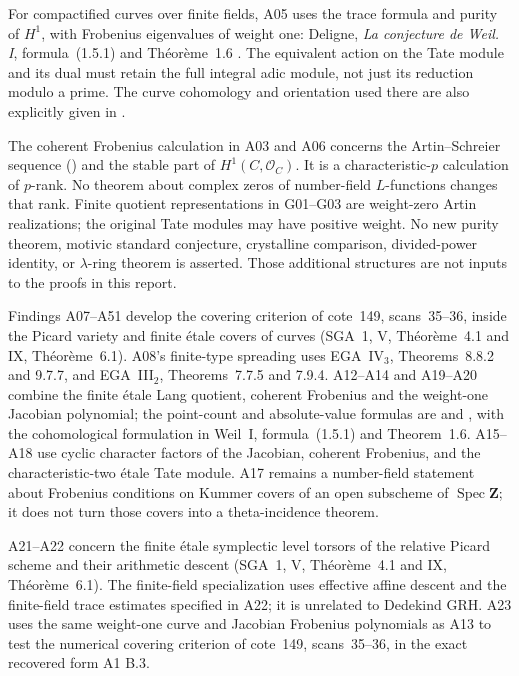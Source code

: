For compactified curves over finite fields, A05 uses the trace
formula and purity of $H^1$, with Frobenius eigenvalues of weight one:
Deligne, \emph{La conjecture de Weil. I}, formula~(1.5.1) and
Th\'eor\`eme~1.6 \cite{WeilI}. The equivalent action on the
Tate module and its dual must retain the full integral adic module,
not just its reduction modulo a prime. The curve cohomology and
orientation used there are also explicitly given in
\cite[Proposition~14.2 and Remark~14.10]{MilneLEC}.

The coherent Frobenius calculation in A03 and A06 concerns the
Artin--Schreier sequence (\cite[Example~7.9(b)]{MilneLEC}) and the stable part of $H^1(C,\mathcal O_C)$.
It is a characteristic-$p$ calculation of $p$-rank. No theorem about
complex zeros of number-field $L$-functions changes that rank.
Finite quotient representations in G01--G03 are weight-zero Artin
realizations; the original Tate modules may have positive weight.
No new purity theorem, motivic standard conjecture, crystalline
comparison, divided-power identity, or $\lambda$-ring theorem is
asserted. Those additional structures are not inputs to the proofs
in this report.


Findings A07--A51 develop the covering criterion of cote~149,
scans~35--36, inside the Picard variety and finite \'etale covers of
curves (SGA~1, V, Th\'eor\`eme~4.1 and IX, Th\'eor\`eme~6.1).
A08's finite-type spreading uses EGA~IV$_3$, Theorems~8.8.2 and
9.7.7, and EGA~III$_2$, Theorems~7.7.5 and 7.9.4.
A12--A14 and A19--A20 combine the finite \'etale Lang quotient,
coherent Frobenius and the weight-one Jacobian polynomial; the
point-count and absolute-value formulas are
\cite[Theorem~19.1(a)--(c)]{MilneAV} and
\cite[Theorem~11.1]{MilneJV}, with the cohomological formulation
in Weil~I, formula~(1.5.1) and Theorem~1.6.
A15--A18 use cyclic character factors of the Jacobian, coherent
Frobenius, and the characteristic-two \'etale Tate module.
A17 remains a number-field statement about Frobenius conditions
on Kummer covers of an open subscheme of $\operatorname{Spec}\mathbf Z$;
it does not turn those covers into a theta-incidence theorem.

A21--A22 concern the finite \'etale symplectic level torsors of the
relative Picard scheme and their arithmetic descent (SGA~1, V,
Th\'eor\`eme~4.1 and IX, Th\'eor\`eme~6.1). The finite-field
specialization uses effective affine descent and the finite-field
trace estimates specified in A22; it is unrelated to Dedekind GRH.
A23 uses the same weight-one curve and Jacobian Frobenius polynomials
as A13 to test the numerical covering criterion of cote~149,
scans~35--36, in the exact recovered form A1 B.3.

